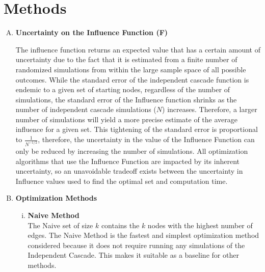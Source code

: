 \documentclass[11pt]{scrartcl} %
\begin{document}
\section{Methods}

\begin{enumerate}[A)]
\setlength{\parindent}{5ex}
\item \textbf {Uncertainty on the Influence Function (F)}
\par
The influence function returns an expected value that has a certain amount of uncertainty due to the fact that it is estimated from a finite number of randomized simulations from within the large sample space of all possible outcomes.  While the standard error of the independent cascade function is endemic to a given set of starting nodes, regardless of the number of simulations, the standard error of the Influence function shrinks as the number of independent cascade simulations ($N$) increases.  Therefore, a larger number of simulations will yield a more precise estimate of the average influence for a given set.  This tightening of the standard error is proportional to $\frac{1}{N^{-1/2}}$, therefore, the uncertainty in the value of the Influence Function can only be reduced by increasing the number of simulations.  All optimization algorithms that use the Influence Function are impacted by its inherent uncertainty, so an unavoidable tradeoff exists between the uncertainty in Influence values used to find the optimal set and computation time. \\

\item \textbf {Optimization Methods} \\
\par

\begin{enumerate}[i.]
\item \textbf{Naive Method}\\
The Naive set of size $k$ contains the $k$ nodes with the highest number of edges.  The Naive Method is the fastest and simplest optimization method considered because it does not require running any simulations of the Independent Cascade.  This makes it suitable as a baseline for other methods.  
\\


\end{enumerate}
\end{enumerate}
\end{document}
